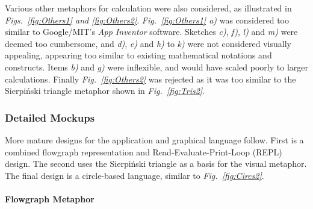 \documentclass[12pt,twoside,notitlepage,xetex]{report}
\begin{document}
Various other metaphors for calculation were also considered, as illustrated in \emph{Figs.~\ref{fig:Others1} and \ref{fig:Others2}}.  \emph{Fig.~\ref{fig:Others1} a)} was considered too similar to Google/MIT's \emph{App Inventor} software.  Sketches \emph{c)}, \emph{f)}, \emph{l)} and \emph{m)} were deemed too cumbersome, and \emph{d)}, \emph{e)} and \emph{h)} to \emph{k)} were not considered visually appealing, appearing too similar to existing mathematical notations and constructs.  Items \emph{b)} and \emph{g)} were inflexible, and would have scaled poorly to larger calculations.  Finally \emph{Fig.~\ref{fig:Others2}} was rejected as it was too similar to the Sierpiński triangle metaphor shown in \emph{Fig.~\ref{fig:Tris2}}.

\subsubsection{Detailed Mockups}

More mature designs for the application and graphical language follow.  First is a combined flowgraph representation and Read-Evaluate-Print-Loop (REPL) design.  The second uses the Sierpiński triangle as a basis for the visual metaphor.  The final design is a circle-based language, similar to \emph{Fig.~\ref{fig:Circs2}}.

\paragraph{Flowgraph Metaphor}\hfill
\end{document}
